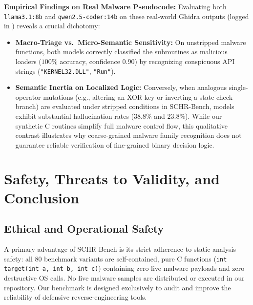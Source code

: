 \documentclass[runningheads]{llncs}
\begin{document}
\textbf{Empirical Findings on Real Malware Pseudocode:} Evaluating both \texttt{llama3.1:8b} and \texttt{qwen2.5-coder:14b} on these real-world Ghidra outputs (logged in ) reveals a crucial dichotomy:
\begin{itemize}
    \item \textbf{Macro-Triage vs.\ Micro-Semantic Sensitivity:} On unstripped malware functions, both models correctly classified the subroutines as malicious loaders ($100\%$ accuracy, confidence $0.90$) by recognizing conspicuous API strings (\texttt{"KERNEL32.DLL"}, \texttt{"Run"}).
    \item \textbf{Semantic Inertia on Localized Logic:} Conversely, when analogous single-operator mutations (e.g., altering an XOR key or inverting a state-check branch) are evaluated under stripped conditions in SCHR-Bench, models exhibit substantial hallucination rates ($38.8\%$ and $23.8\%$). While our synthetic C routines simplify full malware control flow, this qualitative contrast illustrates why coarse-grained malware family recognition does not guarantee reliable verification of fine-grained binary decision logic.
\end{itemize}

\section{Safety, Threats to Validity, and Conclusion}

\subsection{Ethical and Operational Safety}
A primary advantage of SCHR-Bench is its strict adherence to static analysis safety: all 80 benchmark variants are self-contained, pure C functions (\texttt{int target(int a, int b, int c)}) containing zero live malware payloads and zero destructive OS calls. No live malware samples are distributed or executed in our repository. Our benchmark is designed exclusively to audit and improve the reliability of defensive reverse-engineering tools.
\end{document}
